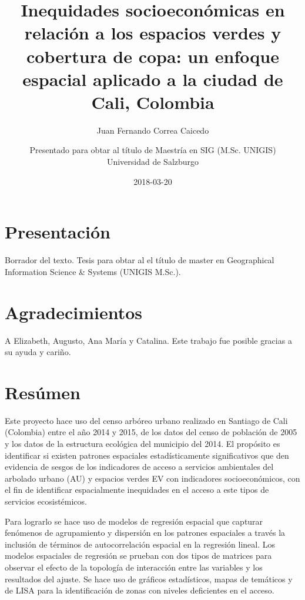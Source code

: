 \documentclass[12pt,]{book}
\title{Inequidades socioeconómicas en relación a los espacios verdes y
cobertura de copa: un enfoque espacial aplicado a la ciudad de Cali,
Colombia}
\subtitle{Juan Fernando Correa Caicedo}
\author{Presentado para obtar al título de Maestría en SIG (M.Sc. UNIGIS) \\ Universidad de Salzburgo}
\date{2018-03-20}
\begin{document}
\maketitle

{
\setcounter{tocdepth}{2}
\tableofcontents
}
\listoftables
\listoffigures
\chapter*{Presentación}\label{presentacion}

Borrador del texto. Tesis para obtar al el título de master en
Geographical Information Science \& Systems (UNIGIS M.Sc.).

\chapter*{Agradecimientos}\label{agradecimientos}

A Elizabeth, Augusto, Ana María y Catalina. Este trabajo fue posible
gracias a su ayuda y cariño.

\chapter*{Resúmen}\label{resumen}

Este proyecto hace uso del censo arbóreo urbano realizado en Santiago de
Cali (Colombia) entre el año 2014 y 2015, de los datos del censo de
población de 2005 y los datos de la estructura ecológica del municipio
del 2014. El propósito es identificar si existen patrones espaciales
estadísticamente significativos que den evidencia de sesgos de los
indicadores de acceso a servicios ambientales del arbolado urbano (AU) y
espacios verdes EV con indicadores socioeconómicos, con el fin de
identificar espacialmente inequidades en el acceso a este tipos de
servicios ecosistémicos.

Para lograrlo se hace uso de modelos de regresión espacial que capturar
fenómenos de agrupamiento y dispersión en los patrones espaciales a
través la inclusión de términos de autocorrelación espacial en la
regresión lineal. Los modelos espaciales de regresión se prueban con dos
tipos de matrices para observar el efecto de la topología de interacción
entre las variables y los resultados del ajuste. Se hace uso de gráficos
estadísticos, mapas de temáticos y de LISA para la identificación de
zonas con niveles deficientes en el acceso.
\end{document}
